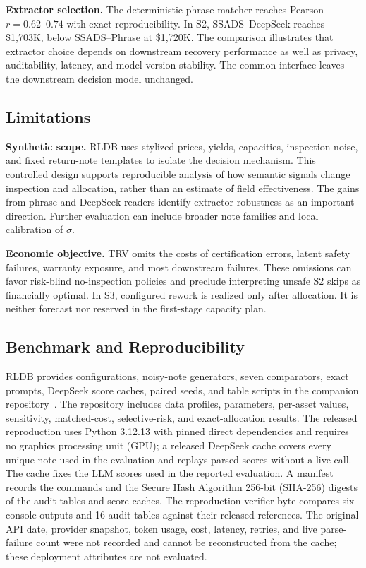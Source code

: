 \documentclass[a4paper,conference]{IEEEtran}
\begin{document}
\smallskip\noindent\textbf{Extractor selection.}
The deterministic phrase matcher reaches Pearson $r{=}0.62$--$0.74$ with exact
reproducibility. In S2, SSADS--DeepSeek reaches \$1,703K, below SSADS--Phrase at
\$1,720K. The comparison illustrates that
extractor choice depends on downstream recovery performance as well as privacy,
auditability, latency, and model-version stability. The common interface leaves the
downstream decision model unchanged.

\subsection{Limitations}\label{sec:limits}
\noindent\textbf{Synthetic scope.}
RLDB uses stylized prices, yields, capacities, inspection noise, and fixed return-note
templates to isolate the decision mechanism. This controlled design supports
reproducible analysis of how semantic signals change inspection and allocation,
rather than an estimate of field effectiveness. The gains from phrase and DeepSeek
readers identify extractor robustness as an important direction. Further evaluation
can include broader note families and local calibration of $\sigma$.

\smallskip\noindent\textbf{Economic objective.}
TRV omits the costs of certification errors, latent safety failures, warranty
exposure, and most downstream failures. These omissions can favor risk-blind
no-inspection policies and preclude interpreting unsafe S2 skips as financially
optimal. In S3, configured rework is realized only after allocation. It is neither
forecast nor reserved in the first-stage capacity plan.

\subsection{Benchmark and Reproducibility}
RLDB provides configurations, noisy-note generators, seven comparators, exact prompts,
DeepSeek score caches, paired seeds, and table scripts in the companion
repository~\cite{RLDBRepo}. The repository includes data profiles, parameters,
per-asset values, sensitivity, matched-cost, selective-risk, and exact-allocation
results. The released reproduction uses Python 3.12.13 with
pinned direct dependencies and requires no graphics processing unit (GPU); a
released DeepSeek cache covers every unique note used in the evaluation and replays
parsed scores without a live call. The cache fixes the LLM scores used in the
reported evaluation. A manifest records the commands and the Secure Hash Algorithm
256-bit (SHA-256) digests of the audit tables and score caches. The reproduction
verifier byte-compares six console outputs and 16 audit tables against their
released references. The original API date, provider snapshot, token usage, cost,
latency, retries, and live parse-failure count were not recorded and cannot be
reconstructed from the cache; these deployment attributes are not evaluated.
\end{document}
